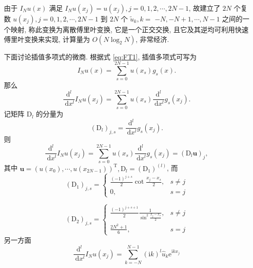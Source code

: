 由于 $I_N u(x)$ 满足 $I_N u\left(x_j\right)=u\left(x_j\right), j=0,1,2, \cdots, 2 N-1$, 故建立了 $2 N$ 个复数 $u\left(x_j\right), j=0,1,2, \cdots, 2 N-1$ 到 $2 N$ 个 $\tilde{u}_k, k=$ $-N,-N+1, \cdots, N-1$ 之间的一个映射, 
称此变换为离散傅里叶变换, 它是一个正交交换, 且它及其逆均可利用快速傅里叶变换来实现, 计算量为 $O\left(N \log _2 N\right)$, 非常经济.

下面讨论插值多项式的微商. 根据式 \eqref{eq:FT1}, 插值多项式可写为
\begin{equation}
I_N u(x)=\sum_{s=0}^{2 N-1} u\left(x_s\right) g_s(x).
\end{equation}
那么
\begin{equation}
\frac{\mathrm{d}^l}{\mathrm{~d} x^l} I_N u\left(x_j\right)=\sum_{s=0}^{2 N-1} u\left(x_s\right) \frac{\mathrm{d}^l}{\mathrm{~d} x^l} g_s\left(x_j\right).
\end{equation}
记矩阵 $\mathrm{D}_l$ 的分量为
\begin{equation}
\left(\mathrm{D}_l\right)_{j, s}=\frac{\mathrm{d}^l}{\mathrm{~d} x^l} g_s\left(x_j\right).
\end{equation}
则
\begin{equation}
\frac{\mathrm{d}^l}{\mathrm{~d} x^l} I_N u\left(x_j\right)=\sum_{s=0}^{2 N-1} u\left(x_s\right) \frac{\mathrm{d}^l}{\mathrm{~d} x^l} g_s\left(x_j\right)=\left(\mathrm{D}_l \boldsymbol{u}\right)_j,
\end{equation}
其中 $\boldsymbol{u}=\left(u\left(x_0\right), \cdots, u\left(x_{2 N-1}\right)\right)^{\mathrm{T}}, \mathrm{D}_l=\left(\mathrm{D}_1\right)^{(l)}$, 而
\begin{equation}
\left(\mathrm{D}_1\right)_{j, s}=\left\{\begin{array}{cc}
\frac{(-1)^{j+s}}{2} \operatorname{cot} \frac{x_j-x_s}{2}, & s \neq j \\
0, & s=j
\end{array}\right.
\end{equation}

\begin{equation}
    \left(\mathrm{D}_2\right)_{j, s}= \begin{cases}\frac{(-1)^{j+s+1}}{2} \frac{1}{\sin ^2 \frac{x_j-x_s}{2}}, & s \neq j \\ \frac{2 N^2+1}{6}, & s=j\end{cases}
    \end{equation}
    另一方面
    \begin{equation}
    \frac{\mathrm{d}^l}{\mathrm{~d} x^l} I_N u\left(x_j\right)=\sum_{k=-N}^{N-1}(\mathrm{i} k)^l \hat{u}_k \mathrm{e}^{\mathrm{i} k x_j}
    \end{equation}

